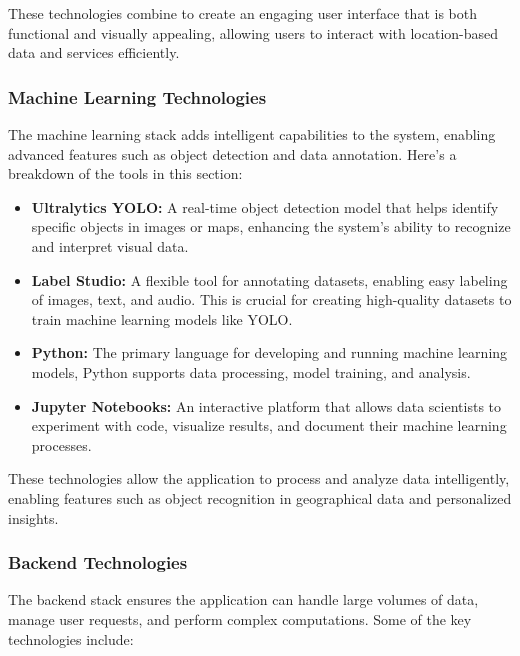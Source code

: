 These technologies combine to create an engaging user interface that is both functional and visually appealing, allowing users to interact with location{-}based data and services efficiently.

\subsubsection{Machine Learning Technologies}

The machine learning stack adds intelligent capabilities to the system, enabling advanced features such as object detection and data annotation. Here’s a breakdown of the tools in this section:

\begin{itemize}
    \item{} \textbf{Ultralytics YOLO:} A real{-}time object detection model that helps identify specific objects in images or maps, enhancing the system's ability to recognize and interpret visual data.
    \item{} \textbf{Label Studio:} A flexible tool for annotating datasets, enabling easy labeling of images, text, and audio. This is crucial for creating high{-}quality datasets to train machine learning models like YOLO\@.
    \item{} \textbf{Python:} The primary language for developing and running machine learning models, Python supports data processing, model training, and analysis.
    \item{} \textbf{Jupyter Notebooks:} An interactive platform that allows data scientists to experiment with code, visualize results, and document their machine learning processes.
\end{itemize}

These technologies allow the application to process and analyze data intelligently, enabling features such as object recognition in geographical data and personalized insights.

\subsubsection{Backend Technologies}

The backend stack ensures the application can handle large volumes of data, manage user requests, and perform complex computations. Some of the key technologies include:

